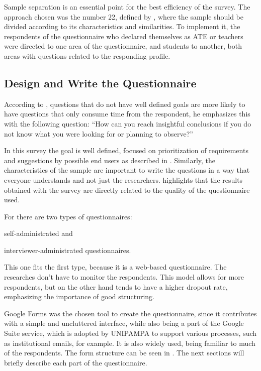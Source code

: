 Sample separation is an essential point for the best efficiency of the survey. The approach chosen was the number 22, defined by , where the sample should be divided according to its characteristics and similarities. To implement it, the respondents of the questionnaire who declared themselves as \ac{ATE} or teachers were directed to one area of the questionnaire, and students to another, both areas with questions related to the responding profile.

\subsection{Design and Write the Questionnaire}\label{sec:survey-questionnaire}

According to , questions that do not have well defined goals are more likely to have questions that only consume time from the respondent, he emphasizes this with the following question: ``How can you reach insightful conclusions if you do not know what you were looking for or planning to observe?''

In this survey the goal is well defined, focused on prioritization of requirements and suggestions by possible end users as described in . Similarly, the characteristics of the sample are important to write the questions in a way that everyone understands and not just the researchers.  highlights that the results obtained with the survey are directly related to the quality of the questionnaire used.

For  there are two types of questionnaires:
\begin{inparaenum}[(i)]
  \item self-administrated and
  \item interviewer-administrated questionnaires.
\end{inparaenum}
This one fits the first type, because it is a web-based questionnaire. The researches don't have to monitor the respondents. This model allows for more respondents, but on the other hand tends to have a higher dropout rate, emphasizing the importance of good structuring.

Google Forms was the chosen tool to create the questionnaire, since it contributes with a simple and uncluttered interface, while also being a part of the Google Suite service, which is adopted by \ac{UNIPAMPA} to support various processes, such as institutional emails, for example. It is also widely used, being familiar to much of the respondents. The form structure can be seen in . The next sections will briefly describe each part of the questionnaire.

